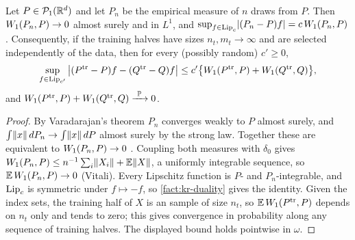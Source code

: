 \begin{lemma}\label{lem:uniform-lip}
Let $P\in\mathcal{P}_{1}(\mathbb{R}^d)$ and let $P_n$ be the empirical measure of $n$ \iid{} draws from $P$.
Then $W_{1}(P_n,P)\to0$ almost surely and in $L^1$, and $\sup_{f\in\operatorname{Lip}_c}\lvert(P_n-P)f\rvert=c\,W_{1}(P_n,P)$.
Consequently, if the training halves have sizes $n_t,m_t\to\infty$ and are selected independently
of the data, then for every (possibly random) $c'\ge0$,
\[
  \sup_{f\in\operatorname{Lip}_{c'}}\big|(P^{\mathrm{tr}}-P)f-(Q^{\mathrm{tr}}-Q)f\big|\le c'\big\{W_{1}(P^{\mathrm{tr}},P)+W_{1}(Q^{\mathrm{tr}},Q)\big\},
\]
and $W_{1}(P^{\mathrm{tr}},P)+W_{1}(Q^{\mathrm{tr}},Q)\xrightarrow{\ \mathbb{P}\ }0$.
\end{lemma}

\begin{proof}
By Varadarajan's theorem $P_n$ converges weakly to $P$ almost surely, and
$\int\lVert x\rVert\,dP_n\to\int\lVert x\rVert\,dP$ almost surely by the strong law. Together these are
equivalent to $W_{1}(P_n,P)\to0$ \citep[Thm.~6.9]{villani2009optimal}. Coupling both measures with
$\delta_0$ gives $W_{1}(P_n,P)\le n^{-1}\sum_i\lVert X_i\rVert+\mathbb{E}\lVert X\rVert$, a uniformly integrable
sequence, so $\mathbb{E}\,W_{1}(P_n,P)\to0$ (Vitali). Every Lipschitz function is $P$- and $P_n$-integrable,
and $\operatorname{Lip}_c$ is symmetric under $f\mapsto-f$, so \cref{fact:kr-duality} gives the identity. Given
the index sets, the training half of $X$ is an \iid{} sample of size $n_t$, so
$\mathbb{E}\,W_{1}(P^{\mathrm{tr}},P)$ depends on $n_t$ only and tends to zero; this gives convergence in probability
along any sequence of training halves. The displayed bound holds pointwise in $\omega$.
\end{proof}

